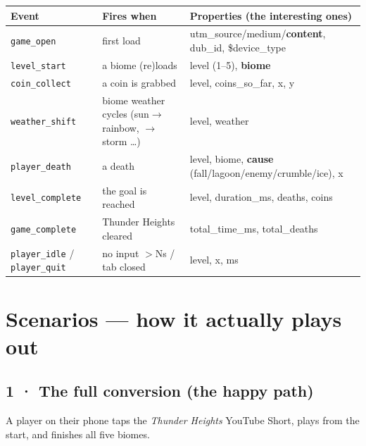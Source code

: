 \documentclass[11pt]{article}
\begin{document}
\begin{center}\footnotesize\setlength{\tabcolsep}{4pt}
\begin{tabular}{@{}P{2.7cm}P{4.6cm}P{6.7cm}@{}}
\toprule
Event & Fires when & Properties (the interesting ones) \\
\midrule
\texttt{game\_open} & first load & utm\_source/medium/\textbf{content}, dub\_id, \$device\_type \\
\texttt{level\_start} & a biome (re)loads & level (1--5), \textbf{biome} \\
\texttt{coin\_collect} & a coin is grabbed & level, coins\_so\_far, x, y \\
\texttt{weather\_shift} & biome weather cycles (sun$\to$rainbow, $\to$storm \ldots) & level, weather \\
\texttt{player\_death} & a death & level, biome, \textbf{cause} (fall/lagoon/enemy/crumble/ice), x \\
\texttt{level\_complete} & the goal is reached & level, duration\_ms, deaths, coins \\
\texttt{game\_complete} & Thunder Heights cleared & total\_time\_ms, total\_deaths \\
\texttt{player\_idle} / \texttt{player\_quit} & no input $>$Ns / tab closed & level, x, ms \\
\bottomrule
\end{tabular}
\end{center}

\section{Scenarios --- how it actually plays out}

\subsection{1 · The full conversion (the happy path)}
A player on their phone taps the \emph{Thunder Heights} YouTube Short, plays from the start, and
finishes all five biomes.
\end{document}
